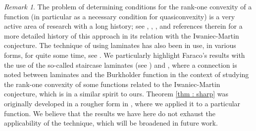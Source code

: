 \documentclass[11pt, a4paper, reqno]{elsarticle}
\theoremstyle{definition}
\theoremstyle{remark}
\newtheorem{remark}{Remark}
\begin{document}
\begin{remark}
       The problem of determining conditions for the rank-one convexity
    of a function (in particular as a necessary condition for quasiconvexity)
    is a very active area of research with a long history;
 see \cite{Banuelos}, \cite{BaernsteinII1997}, \cite{Iwaniec2002Nonlinear},
 \cite{Astala2012BurkholderMappings} and references therein for a more detailed history of this approach
    in its relation with the Iwaniec-Martin conjecture. The technique of using laminates has
    also been in use, in various forms, for quite some time, see
    \cite{Kinderlehrer1991CharacterizationsGradients}. 
    We particularly highlight Faraco's results with the use of the so-called staircase
    laminates (see \cite{Faraco2003}) and
    \cite{Boros2013}, where a connection
    is noted between laminates and the Burkholder function in the context of studying
    the rank-one convexity of some functions related to the
    Iwaniec-Martin conjecture, which is in a similar
    spirit to ours. Theorem \ref{thm : sharp} was 
    originally developed in a rougher form
     in \cite{Cassese},
    where we applied it to a particular function.
    We believe that the results we have here do not exhaust
    the applicability of the technique, which will be broadened in future work. 
\end{remark}
\end{document}
